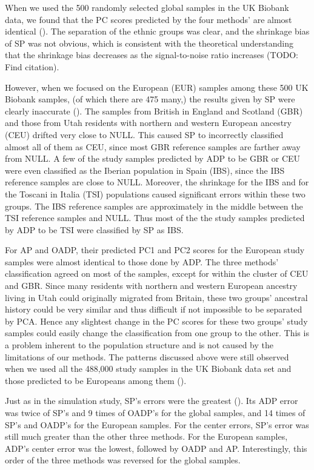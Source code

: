 \documentclass{article}
\newcommand{\todo}[1]{{\color{red} (TODO: #1)}}
\begin{document}
When we used the 500 randomly selected global samples
in the UK Biobank data,
we found that the PC scores predicted by the four methods' are almost identical ().
The separation of the ethnic groups was clear,
and the shrinkage bias of SP was not obvious,
which is consistent with the theoretical understanding
that the shrinkage bias decreases
as the signal-to-noise ratio increases \todo{Find citation}.

However, when we focused on the European (EUR) samples
among these 500 UK Biobank samples,
(of which there are 475 many,)
the results given by SP were clearly inaccurate ().
The samples from British in England and Scotland (GBR)
and those from Utah residents with northern and western European ancestry	(CEU)
drifted very close to NULL.
This caused SP to incorrectly classified almost all of them as CEU,
since most GBR reference samples are farther away from NULL.
A few of the study samples predicted by ADP to be GBR or CEU
were even classified as the Iberian population in Spain (IBS),
since the IBS reference samples are close to NULL.
Moreover, the shrinkage for the IBS
and for the Toscani in Italia (TSI) populations
caused significant errors within these two groups.
The IBS reference samples
are approximately in the middle
between the TSI reference samples and NULL.
Thus most of the the study samples predicted by ADP to be TSI
were classified by SP as IBS.

For AP and OADP, their predicted PC1 and PC2 scores
for the European study samples
were almost identical
to those done by ADP.
The three methods' classification
agreed on most of the samples,
except for within the cluster of CEU and GBR.
Since many residents with northern and western European ancestry living in Utah
could originally migrated from Britain,
these two groups' ancestral history could be very similar
and thus difficult if not impossible to be separated by PCA.
Hence any slightest change
in the PC scores for these two groups' study samples
could easily change the classification from one group to the other.
This is a problem inherent to the population structure
and is not caused by the limitations of our methods.
The patterns discussed above
were still observed
when we used all the 488,000 study samples in the UK Biobank data set
and those predicted to be Europeans among them ().


Just as in the simulation study,
SP's errors were the greatest ().
Its ADP error
was twice of SP's and 9 times of OADP's for the global samples,
and 14 times of SP's and OADP's for the European samples.
For the center errors,
SP's error was still much greater than the other three methods.
For the European samples,
ADP's center error was the lowest,
followed by OADP and AP.
Interestingly, this order of the three methods
was reversed for the global samples.
\end{document}
